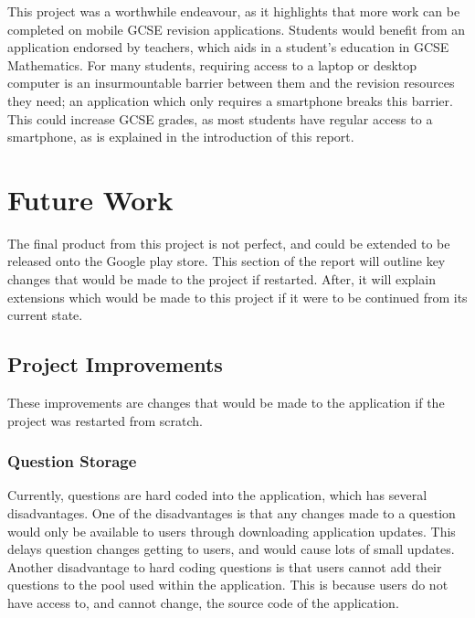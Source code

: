 \documentclass{article}
\begin{document}
This project was a worthwhile endeavour, as it highlights that more work can be completed on mobile GCSE revision applications. Students would benefit from an application endorsed by teachers, which aids in a student's education in GCSE Mathematics. For many students, requiring access to a laptop or desktop computer is an insurmountable barrier between them and the revision resources they need; an application which only requires a smartphone breaks this barrier. This could increase GCSE grades, as most students have regular access to a smartphone, as is explained in the introduction of this report. \par

\section{Future Work}
\label{section:futureWork}

The final product from this project is not perfect, and could be extended to be released onto the Google play store. This section of the report will outline key changes that would be made to the project if restarted. After, it will explain extensions which would be made to this project if it were to be continued from its current state. \par

\subsection{Project Improvements}

These improvements are changes that would be made to the application if the project was restarted from scratch.

\subsubsection{Question Storage}

Currently, questions are hard coded into the application, which has several disadvantages. One of the disadvantages is that any changes made to a question would only be available to users through downloading application updates. This delays question changes getting to users, and would cause lots of small updates. Another disadvantage to hard coding questions is that users cannot add their questions to the pool used within the application. This is because users do not have access to, and cannot change, the source code of the application. \par
\end{document}
